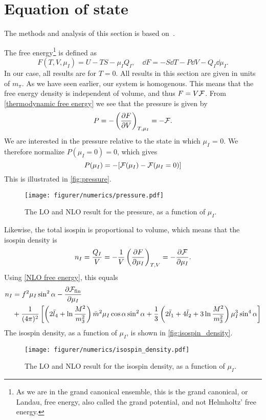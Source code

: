 \section{Equation of state}
The methods and analysis of this section is based on~\cite{Peskin:IntroQFT,Andersen:two-flavor-chpt,andersen2012introduction}.

The free energy\footnote{As we are in the grand canonical ensemble, this is the grand canonical, or Landau, free energy, also called the grand potential, and not Helmholtz' free energy.}
is defined as
\begin{equation}
    \label{thermodynamic free energy}
    F(T, V, \mu_I) = U - TS - \mu_I Q_I, 
    \quad \dd 
    F = - S \dd T - P \dd V - Q_I \dd \mu_I.
\end{equation}
In our case, all results are for $T = 0$.
All results in this section are given in units of $m_\pi$.
As we have seen earlier, our system is homogenous.
This means that the free energy density is independent of volume, and thus $F = V \mathcal{F}$.
From  \cref{thermodynamic free energy} we see that the pressure is given by
\begin{equation}
    P = - \left(\diffp{F}{V}\right)_{T, \mu_I} = - \Ef.
\end{equation}
We are interested in the pressure relative to the state in which $\mu_I$ = 0. We therefore normalize $P(\mu_I=0) = 0$, which gives  
\begin{equation}
    P(\mu_I) = -[\mathcal{F}(\mu_I) - \mathcal{F}(\mu_I = 0)]
\end{equation}
This is illustrated in \autoref{fig:pressure}.
\begin{figure}[h]
    \centering
    \vspace{-0.2cm}
    \texttt{[image: figurer/numerics/pressure.pdf]}
    \caption{The LO and NLO result for the pressure, as a function of $\mu_I$.}
    \label{fig:pressure}
\end{figure}

Likewise, the total isospin is proportional to volume, which means that the isospin density is
\begin{equation}
    n_I = \frac{Q_I}{V} = - \frac{1}{V} \left(\diffp{F}{\mu_I}\right)_{T, V}
    = - \diffp{\Ef}{\mu_I}.
\end{equation}
Using \cref{NLO free energy}, this equals
\begin{align}
    \nonumber
    n_I & = 
    f^2 \mu_I \sin^2 \alpha
    - \diffp{\Ef_\mathrm{fin}}{\mu_I} \\
    & + \frac{1}{(4 \pi)^2}
    \left[
            \left(2\bar l_4+\ln\frac{M^2}{m_3^2}\right)\bar m^2 \mu_I \cos\alpha \sin^2 \alpha
            +\frac{1}{3}\left(2\bar l_1 + 4 \bar l_2 + 3\ln\frac{M^2}{m_3^2}\right)\mu_I^3 \sin^4 \alpha
    \right]
\end{align}
The isospin density, as a function of $\mu_I$, is shown in \autoref{fig:isospin_density}.
\begin{figure}[h]
    \centering
    \vspace{-0.2cm}
    \texttt{[image: figurer/numerics/isospin\_density.pdf]}
    \caption{The LO and NLO result for the isospin density, as a function of $\mu_I$.}
    \label{fig:isospin_density}
\end{figure}

